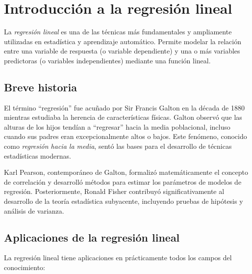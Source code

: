 \section{Introducción a la regresión lineal}

La \emph{regresión lineal} es una de las técnicas más fundamentales y ampliamente utilizadas en estadística y aprendizaje automático. Permite modelar la relación entre una variable de respuesta (o variable dependiente) y una o más variables predictoras (o variables independientes) mediante una función lineal.

\subsection{Breve historia}

El término ``regresión'' fue acuñado por Sir Francis Galton en la década de 1880 mientras estudiaba la herencia de características físicas. Galton observó que las alturas de los hijos tendían a ``regresar'' hacia la media poblacional, incluso cuando sus padres eran excepcionalmente altos o bajos. Este fenómeno, conocido como \emph{regresión hacia la media}, sentó las bases para el desarrollo de técnicas estadísticas modernas.

Karl Pearson, contemporáneo de Galton, formalizó matemáticamente el concepto de correlación y desarrolló métodos para estimar los parámetros de modelos de regresión. Posteriormente, Ronald Fisher contribuyó significativamente al desarrollo de la teoría estadística subyacente, incluyendo pruebas de hipótesis y análisis de varianza.

\subsection{Aplicaciones de la regresión lineal}

La regresión lineal tiene aplicaciones en prácticamente todos los campos del conocimiento:

